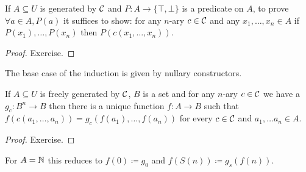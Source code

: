 \begin{boxthe}
\begin{thm}
    If $A \subseteq U$ is generated by $\mathcal{C}$ and $P \colon A \to \{ \top, \bot\}$ is a predicate on $A$, to prove $\forall a \in A, P(a)$ it suffices to show: for any $n$-ary $c \in \mathcal{C}$ and any $x_1, \dots, x_n \in A$ if $P(x_1), \dots, P(x_n)$ then $P(c(x_1, \dots, x_n))$.
\end{thm}
\end{boxthe}
\begin{proof}
    Exercise.
\end{proof}

\begin{rem}
    The base case of the induction is given by nullary constructors.
\end{rem}

\begin{boxthe}
\begin{thm}
    If $A \subseteq U$ is freely generated by $\mathcal{C}$, $B$ is a set and for any $n$-ary $c \in \mathcal{C}$ we have a $g_c \colon B^n \to B$ then there is a unique function $f \colon A \to B$ such that $f(c(a_1, \dots, a_n)) = g_c(f(a_1), \dots, f(a_n))$ for every $c \in \mathcal{C}$ and $a_1, \dots a_n \in A$. 
\end{thm}
\end{boxthe}
\begin{proof}
Exercise.
\end{proof}

\begin{example}
    For $A = \mathbb{N}$ this reduces to $f(0) \coloneq g_0$ and $f(S(n)) \coloneq g_s(f(n))$.
\end{example}